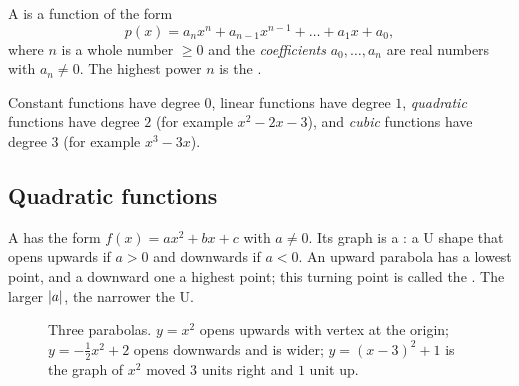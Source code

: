 \begin{definition}[Polynomial]\label{def:polynomial}
A  is a function of the form
\[
  p(x) = a_n x^n + a_{n-1}x^{n-1} + \dots + a_1 x + a_0 ,
\]
where $n$ is a whole number $\ge 0$ and the \emph{coefficients}
$a_0, \dots, a_n$ are real numbers with $a_n \neq 0$. The highest power $n$ is
the .
\end{definition}

Constant functions have degree $0$, linear functions have degree $1$,
\emph{quadratic} functions have degree $2$ (for example $x^2 - 2x - 3$), and
\emph{cubic} functions have degree $3$ (for example $x^3 - 3x$).

\subsection{Quadratic functions}

A  has the form $f(x) = ax^2 + bx + c$ with
$a \neq 0$. Its graph is a : a U shape that opens upwards if
$a > 0$ and downwards if $a < 0$. An upward parabola has a lowest point, and a
downward one a highest point; this turning point is called the .
The larger $\lvert a\rvert$, the narrower the U.

\begin{figure}[htbp]
\centering
{}
\caption{Three parabolas. $y = x^2$ opens upwards with vertex at the origin;
  $y = -\tfrac12 x^2 + 2$ opens downwards and is wider; $y = (x-3)^2 + 1$ is
  the graph of $x^2$ moved $3$ units right and $1$ unit up.}
\label{fig:parabolas}
\end{figure}

